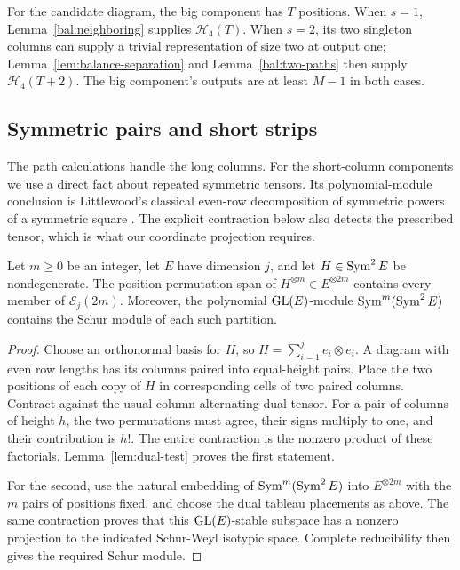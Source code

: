For the candidate diagram, the big component has $T$ positions.
When $s=1$, Lemma~\ref{bal:neighboring} supplies
$\mathcal H_4(T)$.  When $s=2$, its two singleton columns can
supply a trivial representation of size two at output one;
Lemma~\ref{lem:balance-separation} and
Lemma~\ref{bal:two-paths} then supply $\mathcal H_4(T+2)$.
The big component's outputs are at least $M-1$ in both cases.

\subsection{Symmetric pairs and short strips}

The path calculations handle the long columns. For the short-column
components we use a direct fact about repeated symmetric tensors.
Its polynomial-module conclusion is Littlewood's classical even-row
decomposition of symmetric powers of a symmetric square
\cite[Chapter~I, Section~5, Example~5(a); Appendix~A, Section~7,
Example~(1)]{Macdonald}.
The explicit contraction below also detects the prescribed tensor,
which is what our coordinate projection requires.

\begin{lemma}
\label{bal:even-rows}
Let $m\ge0$ be an integer, let $E$ have dimension $j$, and let
$H\in\operatorname{Sym}^2 E$ be
nondegenerate.  The position-permutation span of
$H^{\otimes m}\in E^{\otimes 2m}$ contains every member of
$\mathcal E_j(2m)$.  Moreover, the polynomial $\operatorname{GL}(E)$-module
$\operatorname{Sym}^m(\operatorname{Sym}^2 E)$ contains the Schur module of each such
partition.
\end{lemma}

\begin{proof}
Choose an orthonormal basis for $H$, so
$H=\sum_{i=1}^j e_i\otimes e_i$.  A diagram with even row lengths
has its columns paired into equal-height pairs.  Place the two
positions of each copy of $H$ in corresponding cells of two
paired columns.  Contract against the usual column-alternating
dual tensor.  For a pair of columns of height $h$, the two
permutations must agree, their signs multiply to one, and their
contribution is $h!$.  The entire contraction is the nonzero
product of these factorials.  Lemma~\ref{lem:dual-test} proves
the first statement.

For the second, use the natural embedding of
$\operatorname{Sym}^m(\operatorname{Sym}^2 E)$ into $E^{\otimes 2m}$ with the $m$ pairs
of positions fixed, and choose the dual tableau placements as
above.  The same contraction proves that this $\operatorname{GL}(E)$-stable
subspace has a nonzero projection to the indicated Schur-Weyl
isotypic space.  Complete reducibility then gives the required
Schur module.
\end{proof}

